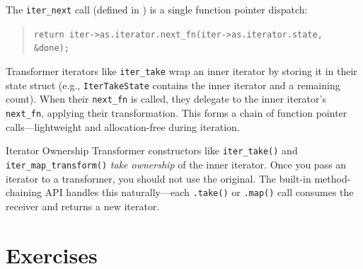 The \lstinline|iter_next| call (defined in ) is a single function pointer dispatch:

\begin{quote}
\texttt{return iter->as.iterator.next\_fn(iter->as.iterator.state, \&done);}
\end{quote}

Transformer iterators like \lstinline|iter_take| wrap an inner iterator by storing it in their state struct (e.g., \lstinline|IterTakeState| contains the inner iterator and a remaining count).
When their \lstinline|next_fn| is called, they delegate to the inner iterator's \lstinline|next_fn|, applying their transformation.
This forms a chain of function pointer calls---lightweight and allocation-free during iteration.

\begin{notebox}{Iterator Ownership}
Transformer constructors like \lstinline|iter_take()| and \lstinline|iter_map_transform()| \emph{take ownership} of the inner iterator.
Once you pass an iterator to a transformer, you should not use the original.
The built-in method-chaining API handles this naturally---each \lstinline|.take()| or \lstinline|.map()| call consumes the receiver and returns a new iterator.
\end{notebox}

\section{Exercises}\label{sec:iter-exercises}

